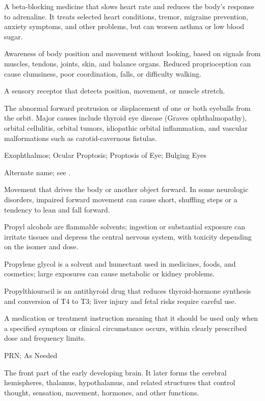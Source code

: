  A beta-blocking medicine that slows heart rate and reduces the body's response to adrenaline. It treats selected heart conditions, tremor, migraine prevention, anxiety symptoms, and other problems, but can worsen asthma or low blood sugar.

 Awareness of body position and movement without looking, based on signals from muscles, tendons, joints, skin, and balance organs. Reduced proprioception can cause clumsiness, poor coordination, falls, or difficulty walking.

 A sensory receptor that detects position, movement, or muscle stretch.

 The abnormal forward protrusion or displacement of one or both eyeballs from the orbit. Major causes include thyroid eye disease (Graves ophthalmopathy), orbital cellulitis, orbital tumors, idiopathic orbital inflammation, and vascular malformations such as carotid-cavernous fistulas.

\synonyms
Exophthalmos; Ocular Proptosis; Proptosis of Eye; Bulging Eyes

 Alternate name; see .

 Movement that drives the body or another object forward. In some neurologic disorders, impaired forward movement can cause short, shuffling steps or a tendency to lean and fall forward.

 Propyl alcohols are flammable solvents; ingestion or substantial exposure can irritate tissues and depress the central nervous system, with toxicity depending on the isomer and dose.

 Propylene glycol is a solvent and humectant used in medicines, foods, and cosmetics; large exposures can cause metabolic or kidney problems.

 Propylthiouracil is an antithyroid drug that reduces thyroid-hormone synthesis and conversion of T4 to T3; liver injury and fetal risks require careful use.

 A medication or treatment instruction meaning that it should be used only when a specified symptom or clinical circumstance occurs, within clearly prescribed dose and frequency limits.

\synonyms
PRN; As Needed

 The front part of the early developing brain. It later forms the cerebral hemispheres, thalamus, hypothalamus, and related structures that control thought, sensation, movement, hormones, and other functions.

